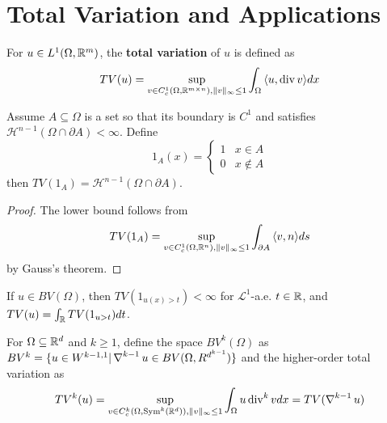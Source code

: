 \section{Total Variation and Applications}
\label{sec:total-vari-appl}

\begin{defn}
  \label{sec:total-vari-appl-1}
  For $u \in L^{1}(\Omega, \mathbb{R}^{m})$, the \textbf{total variation} of
  $u$ is defined as
  \begin{equation}
    \label{eq:50}
    TV(u)= \sup_{v \in C_{c}^{1}(\Omega, \R^{m \times n}), \| v
      \|_{\infty} \leq 1} \int_{\Omega} \IP{u, \divergence v} dx
  \end{equation}
\end{defn}

\begin{thm}
  \label{sec:total-vari-appl-2}
  Assume $A \subseteq \Omega$ is a set so that its boundary is $C^{1}$
  and satisfies $\mathcal{H}^{n-1}(\Omega \cap \partial A) < \infty$.
  Define
  \begin{equation}
    \label{eq:51}
    1_{A}(x) =
    \begin{cases}
      1 & x \in A \\
      0 & x \notin A
    \end{cases}
  \end{equation}
  then $TV(1_{A}) = \mathcal{H}^{n-1}(\Omega \cap \partial A)$.
\end{thm}

\begin{proof}
  The lower bound follows from
  \begin{align}
    TV(1_{A}) = \sup_{v \in C_{c}^{1}(\Omega, \R^{n}), \| v
      \|_{\infty} \leq 1} \int_{\partial A} \IP{v, n} ds
  \end{align}
  by Gauss's theorem.
\end{proof}

\begin{thm}
  \label{sec:total-vari-appl-3}
  If $u \in BV(\Omega)$, then $TV(1_{u(x) > t}) < \infty$ for
  $\mathcal{L}^{1}$-a.e. $t \in \mathbb{R}$, and $TV(u) = \int_{\mathbb{R}} TV(1_{u >
    t}) dt$.
\end{thm}

\begin{defn}
  \label{sec:total-vari-appl-4}
  For $\Omega \subseteq \mathbb{R}^{d}$ and $k \geq 1$, define the space
  $BV^{k}(\Omega)$ as $BV^{k} = \{ u \in W^{k-1, 1} | \operatorname{\nabla}^{k-1}u \in
BV(\Omega, R^{d^{k-1}}) \}$ and the higher-order total variation as
\begin{align}
  \label{eq:56}
  TV^{k}(u) = \sup_{v \in C_{c}^{k}(\Omega, \operatorname*{Sym}^{k}(\mathbb{R}^{d})), \| v
    \|_{\infty} \leq 1} \int_{\Omega} u \operatorname{div}^{k} v dx = TV(\operatorname{\nabla}^{k-1}
  u)
\end{align}
\end{defn}

